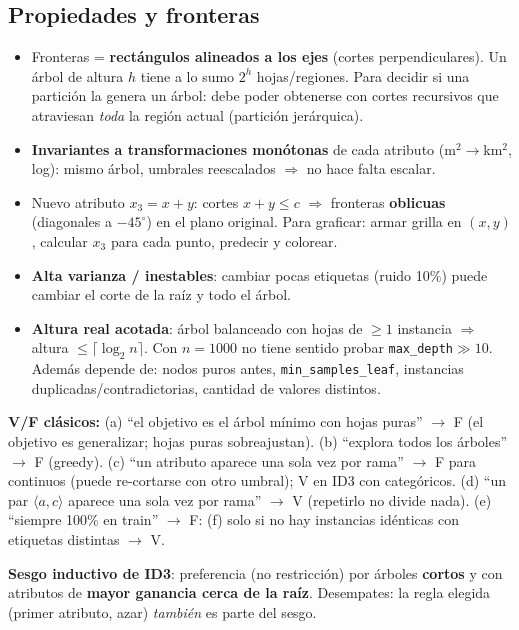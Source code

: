 \documentclass[10pt,a4paper]{article}
\begin{document}
\subsection{Propiedades y fronteras}
\begin{itemize}
  \item Fronteras = \textbf{rectángulos alineados a los ejes} (cortes perpendiculares). Un árbol de altura $h$ tiene a lo sumo $2^h$ hojas/regiones. Para decidir si una partición la genera un árbol: debe poder obtenerse con cortes recursivos que atraviesan \emph{toda} la región actual (partición jerárquica).
  \item \textbf{Invariantes a transformaciones monótonas} de cada atributo (m$^2\to$km$^2$, log): mismo árbol, umbrales reescalados $\Rightarrow$ no hace falta escalar.
  \item Nuevo atributo $x_3=x+y$: cortes $x+y\le c$ $\Rightarrow$ fronteras \textbf{oblicuas} (diagonales a $-45^\circ$) en el plano original. Para graficar: armar grilla en $(x,y)$, calcular $x_3$ para cada punto, predecir y colorear.
  \item \textbf{Alta varianza / inestables}: cambiar pocas etiquetas (ruido 10\%) puede cambiar el corte de la raíz y todo el árbol.
  \item \textbf{Altura real acotada}: árbol balanceado con hojas de $\ge1$ instancia $\Rightarrow$ altura $\le\lceil\log_2 n\rceil$. Con $n=1000$ no tiene sentido probar \texttt{max\_depth}$\gg 10$. Además depende de: nodos puros antes, \texttt{min\_samples\_leaf}, instancias duplicadas/contradictorias, cantidad de valores distintos.
\end{itemize}
\begin{trampa}
\textbf{V/F clásicos:}
(a) ``el objetivo es el árbol mínimo con hojas puras'' $\to$ F (el objetivo es generalizar; hojas puras sobreajustan).
(b) ``explora todos los árboles'' $\to$ F (greedy).
(c) ``un atributo aparece una sola vez por rama'' $\to$ F para continuos (puede re-cortarse con otro umbral); V en ID3 con categóricos.
(d) ``un par $\langle a,c\rangle$ aparece una sola vez por rama'' $\to$ V (repetirlo no divide nada).
(e) ``siempre 100\% en train'' $\to$ F: (f) solo si no hay instancias idénticas con etiquetas distintas $\to$ V.
\end{trampa}
\textbf{Sesgo inductivo de ID3}: preferencia (no restricción) por árboles \textbf{cortos} y con atributos de \textbf{mayor ganancia cerca de la raíz}. Desempates: la regla elegida (primer atributo, azar) \emph{también} es parte del sesgo.
\end{document}
